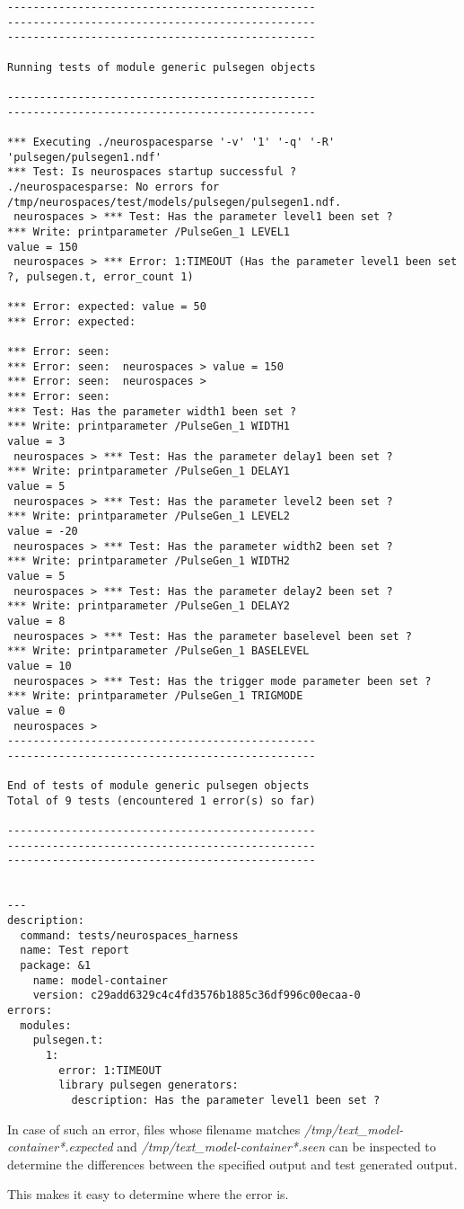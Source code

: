 \documentclass[12pt]{article}
\begin{document}
\begin{verbatim}
------------------------------------------------
------------------------------------------------
------------------------------------------------

Running tests of module generic pulsegen objects

------------------------------------------------
------------------------------------------------

*** Executing ./neurospacesparse '-v' '1' '-q' '-R' 'pulsegen/pulsegen1.ndf'
*** Test: Is neurospaces startup successful ?
./neurospacesparse: No errors for /tmp/neurospaces/test/models/pulsegen/pulsegen1.ndf.
 neurospaces > *** Test: Has the parameter level1 been set ?
*** Write: printparameter /PulseGen_1 LEVEL1
value = 150
 neurospaces > *** Error: 1:TIMEOUT (Has the parameter level1 been set ?, pulsegen.t, error_count 1)

*** Error: expected: value = 50
*** Error: expected: 

*** Error: seen: 
*** Error: seen:  neurospaces > value = 150
*** Error: seen:  neurospaces > 
*** Error: seen: 
*** Test: Has the parameter width1 been set ?
*** Write: printparameter /PulseGen_1 WIDTH1
value = 3
 neurospaces > *** Test: Has the parameter delay1 been set ?
*** Write: printparameter /PulseGen_1 DELAY1
value = 5
 neurospaces > *** Test: Has the parameter level2 been set ?
*** Write: printparameter /PulseGen_1 LEVEL2
value = -20
 neurospaces > *** Test: Has the parameter width2 been set ?
*** Write: printparameter /PulseGen_1 WIDTH2
value = 5
 neurospaces > *** Test: Has the parameter delay2 been set ?
*** Write: printparameter /PulseGen_1 DELAY2
value = 8
 neurospaces > *** Test: Has the parameter baselevel been set ?
*** Write: printparameter /PulseGen_1 BASELEVEL
value = 10
 neurospaces > *** Test: Has the trigger mode parameter been set ?
*** Write: printparameter /PulseGen_1 TRIGMODE
value = 0
 neurospaces > 
------------------------------------------------
------------------------------------------------

End of tests of module generic pulsegen objects
Total of 9 tests (encountered 1 error(s) so far)

------------------------------------------------
------------------------------------------------
------------------------------------------------


---
description:
  command: tests/neurospaces_harness
  name: Test report
  package: &1
    name: model-container
    version: c29add6329c4c4fd3576b1885c36df996c00ecaa-0
errors:
  modules:
    pulsegen.t:
      1:
        error: 1:TIMEOUT
        library pulsegen generators:
          description: Has the parameter level1 been set ?
\end{verbatim}
In case of such an error, files whose filename matches {\it /tmp/text\_model-container*.expected} and  {\it /tmp/text\_model-container*.seen} can be inspected to determine the differences between the specified output and test generated output.

This makes it easy to determine where the error is. 
\end{document}
